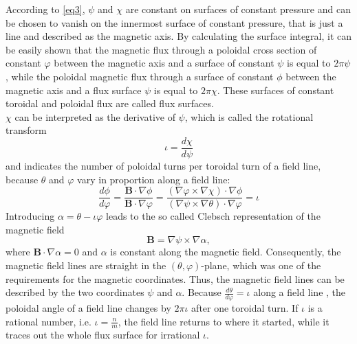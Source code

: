 According to \ref{eq3}, $\psi$ and $\chi$ are constant on surfaces of constant pressure and can be chosen to vanish on the innermost surface of constant pressure, that is just a line and described as the magnetic axis. By calculating the surface integral, it can be easily shown that the magnetic flux through a poloidal cross section of constant $\varphi$ between the magnetic axis and a surface of constant $\psi$ is equal to $2\pi\psi$, while the poloidal magnetic flux through a surface of constant $\phi$ between the magnetic axis and a flux surface $\psi$ is equal to $2\pi\chi$. These surfaces of constant toroidal and poloidal flux are called flux surfaces. \\
$\chi$ can be interpreted as the derivative of $\psi$, which is called the rotational transform
\begin{equation}
    \iota = \frac{d\chi}{d\psi}
\end{equation}
and indicates the number of poloidal turns per toroidal turn of a field line, because $\theta$ and $\varphi$ vary in proportion along a field line:
\begin{equation}
    \frac{d\phi}{d\varphi} = \frac{\textbf{B}\cdot \nabla \phi}{\textbf{B}\cdot \nabla \varphi} = \frac{(\nabla \varphi \times \nabla \chi) \cdot \nabla \phi}{(\nabla \psi \times \nabla \theta) \cdot \nabla \varphi} = \iota
\end{equation}
Introducing $\alpha = \theta - \iota \varphi$ leads to the so called Clebsch representation of the magnetic field
\begin{equation}
    \textbf{B} = \nabla \psi \times \nabla \alpha,
\end{equation}
where $\textbf{B} \cdot \nabla \alpha = 0$ and $\alpha$ is constant along the magnetic field. Consequently, the magnetic field lines are straight in the $(\theta, \varphi)$-plane, which was one of the requirements for the magnetic coordinates. Thus, the magnetic field lines can be described by the two coordinates $\psi$ and $\alpha$. Because $\frac{d\theta}{d\varphi} = \iota$ along a field line , the poloidal angle of a field line changes by $2\pi \iota$ after one toroidal turn. If $\iota$ is a rational number, i.e. $\iota = \frac{n}{m}$, the field line returns to where it started, while it traces out the whole flux surface for irrational $\iota$. \\

